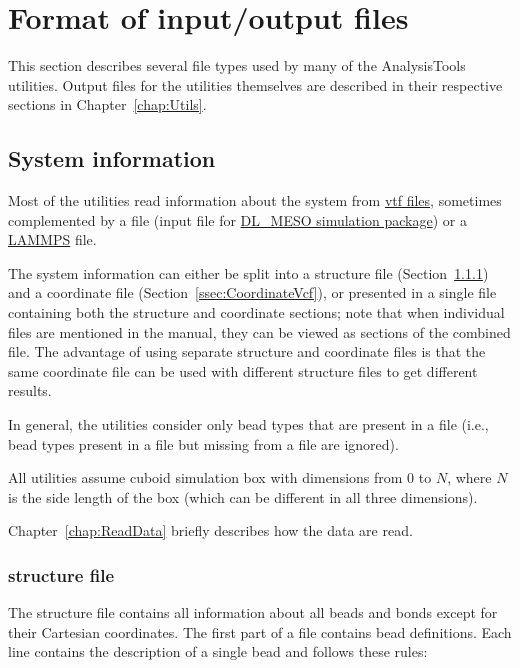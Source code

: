 \chapter{Format of input/output files}\label{chap:input}

This section describes several file types used by many of the
AnalysisTools utilities. Output files for the utilities themselves are
described in their respective sections in Chapter~\ref{chap:Utils}.

\section{System information} %
Most of the utilities read information about the system from
\href{https://github.com/olenz/vtfplugin/wiki/VTF-format}{vtf files},
sometimes complemented by a \field file (input file for
\href{https://www.scd.stfc.ac.uk/Pages/DL_MESO.aspx}{DL\_MESO
simulation package}) or a \href{https://lammps.sandia.gov/}{LAMMPS}
\data file.

The system information can either be split into a \vsf structure file
(Section~\ref{ssec:StructureVsf}) and a \vcf coordinate file
(Section~\ref{ssec:CoordinateVcf}), or presented in a single \vtf file
containing both the structure and coordinate sections; note that when
individual \vscf files are mentioned in the manual, they can be
viewed as \vscf sections of the combined \vtf file. The advantage of
using separate structure and coordinate files is that the same coordinate
file can be used with different structure files to get different results.

In general, the utilities consider only bead types that are present in a
\vcf file (i.e., bead types present in a \vsf file but missing from a \vcf
file are ignored).

All utilities assume cuboid simulation box with dimensions from 0 to $N$,
where $N$ is the side length of the box (which can be different in all
three dimensions).

Chapter~\ref{chap:ReadData} briefly describes how the data are read.

\subsection{\vsf structure file} \label{ssec:StructureVsf} %

The structure file contains all information about all beads and bonds
except for their Cartesian coordinates. The first part of a \vsf
file contains bead definitions. Each line contains the description of a
single bead and follows these rules:

